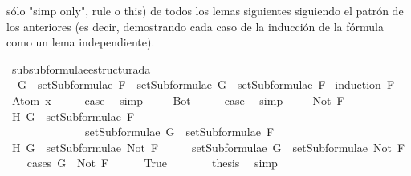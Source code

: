 \begin{isabellebody}
\begin{isamarkuptext}
{  sólo "simp only", rule o this) de todos los lemas siguientes siguiendo 
  el patrón de los anteriores (es decir, demostrando cada caso de la 
  inducción de la fórmula como un lema independiente).}%
\end{isamarkuptext}\isamarkuptrue%
\isamarkupfalse%
\ subsubformulae{\isacharunderscore}estructurada{\isacharcolon}\isanewline
\ \ {\isachardoublequoteopen}G\ {\isasymin}\ setSubformulae\ F\ {\isasymLongrightarrow}\ setSubformulae\ G\ {\isasymsubseteq}\ setSubformulae\ F{\isachardoublequoteclose}\isanewline
%
\isadelimproof
%
\endisadelimproof
%
\isatagproof
{}\isamarkupfalse%
\ {\isacharparenleft}induction\ F{\isacharparenright}\isanewline
\ \ \isamarkupfalse%
\ {\isacharparenleft}Atom\ x{\isacharparenright}\isanewline
\ \ \isamarkupfalse%
\ \isamarkupfalse%
\ {\isacharquery}case\ \isamarkupfalse%
\ simp\ %
\isanewline
{}\isamarkupfalse%
\isanewline
\ \ \isamarkupfalse%
\ Bot\isanewline
\ \ \isamarkupfalse%
\ \isamarkupfalse%
\ {\isacharquery}case\ \isamarkupfalse%
\ simp\ %
\isanewline
{}\isamarkupfalse%
\isanewline
\ \ \isamarkupfalse%
\ {\isacharparenleft}Not\ F{\isacharparenright}\isanewline
\ \ \isamarkupfalse%
\ H{}{\isacharcolon}\ {\isachardoublequoteopen}G\ {\isasymin}\ setSubformulae\ F\ {\isasymLongrightarrow}\ \isanewline
\ \ \ \ \ \ \ \ \ \ \ \ \ \ setSubformulae\ G\ {\isasymsubseteq}\ setSubformulae\ F{\isachardoublequoteclose}\isanewline
\ \ \isamarkupfalse%
\ H{}{\isacharcolon}\ {\isachardoublequoteopen}G\ {\isasymin}\ setSubformulae\ {\isacharparenleft}Not\ F{\isacharparenright}{\isachardoublequoteclose}\isanewline
\ \ \isamarkupfalse%
\ \isamarkupfalse%
\ {\isachardoublequoteopen}setSubformulae\ G\ {\isasymsubseteq}\ setSubformulae\ {\isacharparenleft}Not\ F{\isacharparenright}{\isachardoublequoteclose}\isanewline
\ \ \isamarkupfalse%
\ {\isacharparenleft}cases\ {\isachardoublequoteopen}G\ {\isacharequal}\ Not\ F{\isachardoublequoteclose}{\isacharparenright}\isanewline
\ \ \ \ \isamarkupfalse%
\ True\isanewline
\ \ \ \ \isamarkupfalse%
\ \isamarkupfalse%
\ {\isacharquery}thesis\ \isamarkupfalse%
\ simp\ %
\isanewline
\ \ \isamarkupfalse%

\end{isabellebody}

